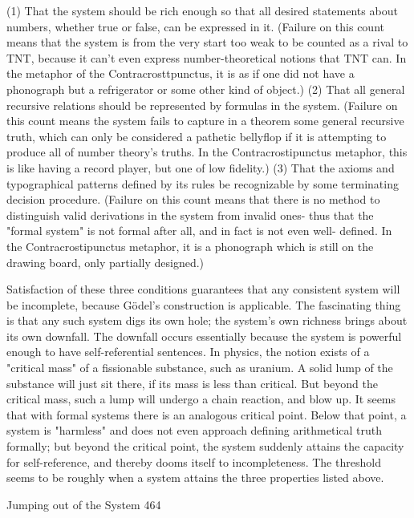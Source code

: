 {   (1) That the system should be rich enough so that all desired statements about
       numbers, whether true or false, can be expressed in it. (Failure on this count
       means that the system is from the very start too weak to be counted as a rival to
       TNT, because it can't even express number-theoretical notions that TNT can.
       In the metaphor of the Contracrosttpunctus, it is as if one did not have a
       phonograph but a refrigerator or some other kind of object.)
   (2) That all general recursive relations should be represented by formulas in the
       system. (Failure on this count means the system fails to capture in a theorem
       some general recursive truth, which can only be considered a pathetic bellyflop
       if it is attempting to produce all of number theory's truths. In the
       Contracrostipunctus metaphor, this is like having a record player, but one of
       low fidelity.)
   (3) That the axioms and typographical patterns defined by its rules be recognizable
       by some terminating decision procedure. (Failure on this count means that there
       is no method to distinguish valid derivations in the system from invalid ones-
       thus that the "formal system" is not formal after all, and in fact is not even well-
       defined. In the Contracrostipunctus metaphor, it is a phonograph which is still
       on the drawing board, only partially designed.)

Satisfaction of these three conditions guarantees that any consistent system will be
incomplete, because Gödel’s construction is applicable.
        The fascinating thing is that any such system digs its own hole; the system's own
richness brings about its own downfall. The downfall occurs essentially because the
system is powerful enough to have self-referential sentences. In physics, the notion exists
of a "critical mass" of a fissionable substance, such as uranium. A solid lump of the
substance will just sit there, if its mass is less than critical. But beyond the critical mass,
such a lump will undergo a chain reaction, and blow up. It seems that with formal
systems there is an analogous critical point. Below that point, a system is "harmless" and
does not even approach defining arithmetical truth formally; but beyond the critical point,
the system suddenly attains the capacity for self-reference, and thereby dooms itself to
incompleteness. The threshold seems to be roughly when a system attains the three
properties listed above.




Jumping out of the System                                                                  464

}
